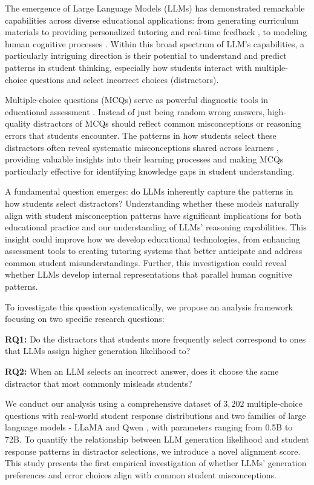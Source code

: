 The emergence of Large Language Models (LLMs) has  demonstrated remarkable capabilities across diverse educational applications: from generating curriculum materials \cite{moein2024beyond} to providing personalized tutoring \cite{alsafari2024towards,sonkar2023class,schmucker2024ruffle} and real-time feedback \cite{nicolicioiu2024panza,bewersdorff2023assessing}, to modeling human cognitive processes \cite{mcintosh2024inadequacy,sonkar2024llm}. Within this broad spectrum of LLM's capabilities, a particularly intriguing direction is their potential to understand and predict patterns in student thinking, especially how students interact with multiple-choice questions and select incorrect choices (distractors).

Multiple-choice questions (MCQs) serve as powerful diagnostic tools in educational assessment \cite{eedi-mining-misconceptions-in-mathematics}. Instead of just being random wrong answers, high-quality distractors of MCQs should reflect common misconceptions or reasoning errors that students encounter. The patterns in how students select these distractors often reveal systematic misconceptions shared across learners \cite{smith1994misconceptions}, providing valuable insights into their learning processes and making MCQs particularly effective for identifying knowledge gaps in student understanding.

A fundamental question emerges: do LLMs inherently capture the patterns in how students select distractors? Understanding whether these models naturally align with student misconception patterns have significant implications for both educational practice and our understanding of LLMs' reasoning capabilities. This insight could improve how we develop educational technologies, from enhancing assessment tools to creating tutoring systems that better anticipate and address common student misunderstandings. Further, this investigation could reveal whether LLMs develop internal representations that parallel human cognitive patterns.

To investigate this question systematically, we propose an analysis framework focusing on two specific research questions:

\textbf{RQ1:} Do the distractors that students more frequently select correspond to ones that LLMs assign higher generation likelihood to?

\textbf{RQ2:}  When an LLM selects an incorrect answer, does it choose the same distractor that most commonly misleads students?

We conduct our analysis using a comprehensive dataset of $3,202$ multiple-choice questions with real-world student response distributions and two families of large language models - LLaMA \cite{touvron2023llama} and Qwen \cite{bai2023qwen}, with parameters ranging from 0.5B to 72B. To quantify the relationship between LLM generation likelihood and student response patterns in distractor selections, we introduce a novel alignment score. This study presents the first empirical investigation of whether LLMs' generation preferences and error choices align with common student misconceptions.


